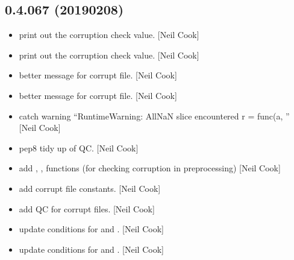 \documentclass[a4paper,10pt,english]{report}
\begin{document}
\subsection{0.4.067 (2019\sphinxhyphen{}02\sphinxhyphen{}08)}
\label{\detokenize{misc/changelog:id209}}\begin{itemize}
\item {} 
 \sphinxhyphen{} print out the corruption check value. {[}Neil
Cook{]}

\item {} 
 \sphinxhyphen{} print out the corruption check value. {[}Neil
Cook{]}

\item {} 
 \sphinxhyphen{} better message for corrupt file. {[}Neil
Cook{]}

\item {} 
 \sphinxhyphen{} better message for corrupt file. {[}Neil
Cook{]}

\item {} 
 \sphinxhyphen{} catch warning “RuntimeWarning: All\sphinxhyphen{}NaN slice
encountered r = func(a, ” {[}Neil Cook{]}

\item {} 
 \sphinxhyphen{} pep8 tidy up of QC. {[}Neil Cook{]}

\item {} 
 \sphinxhyphen{} add , ,
 functions (for checking corruption in
preprocessing) {[}Neil Cook{]}

\item {} 
 \sphinxhyphen{} add corrupt file constants. {[}Neil Cook{]}

\item {} 
 \sphinxhyphen{} add QC for corrupt files. {[}Neil Cook{]}

\item {} 
 \sphinxhyphen{} update conditions for  and .
{[}Neil Cook{]}

\item {} 
 \sphinxhyphen{} update conditions for  and .
{[}Neil Cook{]}


\end{itemize}
\end{document}
